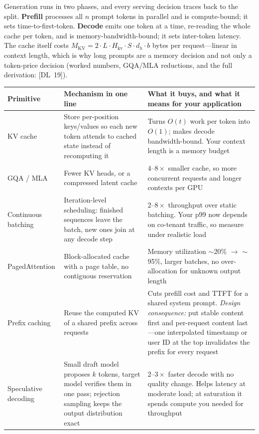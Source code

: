 Generation runs in two phases, and every serving decision traces back to the
split.  \textbf{Prefill} processes all $n$ prompt tokens in parallel and is
compute-bound; it sets time-to-first-token.  \textbf{Decode} emits one token
at a time, re-reading the whole cache per token, and is
memory-bandwidth-bound; it sets inter-token latency.  The cache itself costs
$M_{\mathrm{KV}} = 2 \cdot L \cdot H_{\mathrm{kv}} \cdot S \cdot d_h \cdot b$
bytes per request---linear in context length, which is why long prompts are a
memory decision and not only a token-price decision (worked numbers, GQA/MLA
reductions, and the full derivation: [DL~19]).
\label{fig:kv_cache}

\begin{table}[H]
\centering
\small
\begin{tabularx}{\textwidth}{@{}l X X@{}}
\toprule
\textbf{Primitive} & \textbf{Mechanism in one line} & \textbf{What it buys, and what it means for your application} \\
\midrule
KV cache & Store per-position keys/values so each new token attends to cached state instead of recomputing it & Turns $O(t)$ work per token into $O(1)$; makes decode bandwidth-bound. Your context length is a memory budget \\
GQA / MLA & Fewer KV heads, or a compressed latent cache & $4$--$8\times$ smaller cache, so more concurrent requests and longer contexts per GPU \\
Continuous batching & Iteration-level scheduling: finished sequences leave the batch, new ones join at any decode step & $2$--$8\times$ throughput over static batching. Your p99 now depends on co-tenant traffic, so measure under realistic load \\
PagedAttention & Block-allocated cache with a page table, no contiguous reservation & Memory utilization $\sim$20\% $\to$ $\sim$95\%, larger batches, no over-allocation for unknown output length \\
Prefix caching & Reuse the computed KV of a shared prefix across requests & Cuts prefill cost and TTFT for a shared system prompt. \emph{Design consequence:} put stable content first and per-request content last---one interpolated timestamp or user ID at the top invalidates the prefix for every request \\
Speculative decoding & Small draft model proposes $k$ tokens, target model verifies them in one pass; rejection sampling keeps the output distribution exact & $2$--$3\times$ faster decode with no quality change. Helps latency at moderate load; at saturation it spends compute you needed for throughput \\

\end{tabularx}
\end{table}
